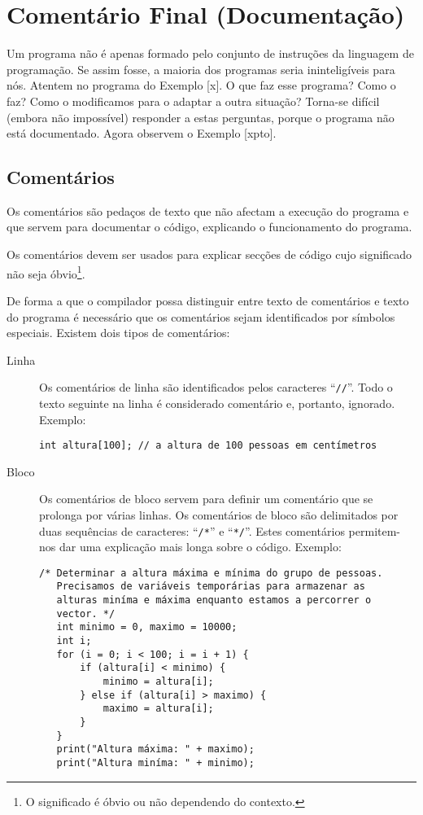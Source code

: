 \chapter{Comentário Final (Documentação)}

Um programa não é apenas formado pelo conjunto de instruções da linguagem de programação. Se assim fosse, a maioria dos programas seria ininteligíveis para nós. Atentem no programa do Exemplo [x]. O que faz esse programa? Como o faz? Como o modificamos para o adaptar a outra situação? Torna-se difícil (embora não impossível) responder a estas perguntas, porque o programa não está documentado. Agora observem o Exemplo [xpto].

\section{Comentários}
Os comentários são pedaços de texto que não afectam a execução do programa e que 
servem para documentar o código, explicando o funcionamento do programa.

Os comentários devem ser usados para explicar secções de código cujo significado não
seja óbvio\footnote{O significado é óbvio ou não dependendo do contexto.}.

De forma a que o compilador possa distinguir entre texto de comentários e texto
do programa é necessário que os comentários sejam identificados por símbolos especiais.
Existem dois tipos de comentários:
\begin{description}
\item[Linha] Os comentários de linha são identificados pelos caracteres ``\texttt{//}''. 
Todo o texto seguinte na linha é considerado comentário e, portanto, ignorado. Exemplo:
\begin{lstlisting}
int altura[100]; // a altura de 100 pessoas em centímetros
\end{lstlisting}
\item[Bloco] Os comentários de bloco servem para definir um comentário que se prolonga por
várias linhas. Os comentários de bloco são delimitados por duas sequências de caracteres:
``\texttt{/*}'' e ``\texttt{*/}''. Estes comentários permitem-nos dar uma explicação mais
longa sobre o código. Exemplo:
\begin{lstlisting}
/* Determinar a altura máxima e mínima do grupo de pessoas.
   Precisamos de variáveis temporárias para armazenar as 
   alturas miníma e máxima enquanto estamos a percorrer o 
   vector. */
   int minimo = 0, maximo = 10000;
   int i;
   for (i = 0; i < 100; i = i + 1) {
       if (altura[i] < minimo) {           
           minimo = altura[i];
       } else if (altura[i] > maximo) {
           maximo = altura[i];
       }
   }
   print("Altura máxima: " + maximo);
   print("Altura miníma: " + minimo);
\end{lstlisting}
\end{description}

